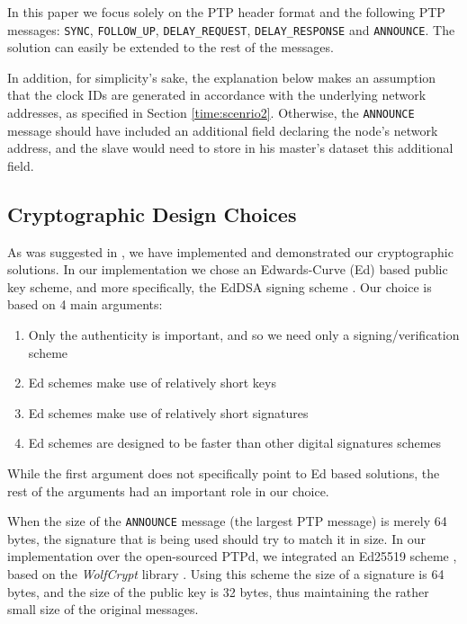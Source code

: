 \documentclass[11pt]{article}
\begin{document}
In this paper we focus solely on the PTP header format and the following PTP messages: \texttt{SYNC}, \texttt{FOLLOW_UP}, \texttt{DELAY_REQUEST}, \texttt{DELAY_RESPONSE} and \texttt{ANNOUNCE}. The solution can easily be extended to the rest of the messages.

In addition, for simplicity's sake, the explanation below  makes an assumption that the clock IDs are generated in accordance with the underlying network addresses, as specified in Section \ref{time:scenrio2}. Otherwise, the \texttt{ANNOUNCE} message should have included an additional field declaring the node's network address, and the slave would need to store in his master's dataset this additional field.



\subsection{Cryptographic Design Choices}\label{overview:crypto}

As was suggested in \cite{Threat_Analysis}, we have implemented and demonstrated our cryptographic solutions. In our implementation we chose an Edwards-Curve (Ed) based public key scheme, and more specifically, the EdDSA signing scheme \cite{Ed}. Our choice is based on 4 main arguments:

\begin{enumerate}

  \item Only the authenticity is important, and so we need only a signing/verification scheme

  \item Ed schemes make use of relatively short keys

  \item Ed schemes make use of relatively short signatures

  \item Ed schemes are designed to be faster than other digital signatures schemes

\end{enumerate}

While the first argument does not specifically point to Ed based solutions, the rest of the arguments had an important role in our choice.



When the size of the \texttt{ANNOUNCE} message (the largest PTP message) is merely 64 bytes, the signature that is being used should try to match it in size. In our implementation over the open-sourced PTPd, we integrated an Ed25519 scheme \cite{Ed25519}, based on the \emph{WolfCrypt} library \cite{WolfCrypt}. Using this scheme the size of a signature is 64 bytes, and the size of the public key is 32 bytes, thus maintaining the rather small size of the original messages.
\end{document}
